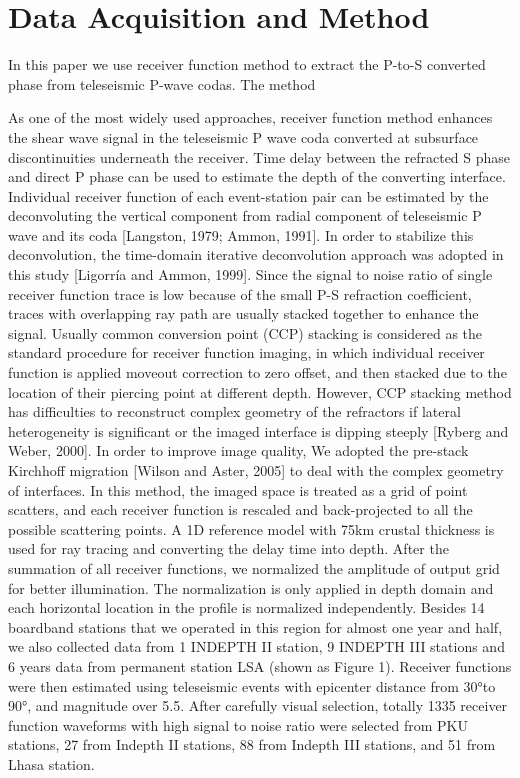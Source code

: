 \section{Data Acquisition and Method}

In this paper we use receiver function method \cite{Langston_1979,ammon1991isolation} to extract the P-to-S converted phase from teleseismic P-wave codas. The method 



As one of the most widely used approaches, receiver function method enhances the shear wave signal in the teleseismic P wave coda converted at subsurface discontinuities underneath the receiver. Time delay between the refracted S phase and direct P phase can be used to estimate the depth of the converting interface. 
Individual receiver function of each event-station pair can be estimated by the deconvoluting the vertical component from radial component of teleseismic P wave and its coda [Langston, 1979; Ammon, 1991]. In order to stabilize this deconvolution, the time-domain iterative deconvolution approach was adopted in this study [Ligorría and Ammon, 1999].
Since the signal to noise ratio of single receiver function trace is low because of the small P-S refraction coefficient, traces with overlapping ray path are usually stacked together to enhance the signal. Usually common conversion point (CCP) stacking is considered as the standard procedure for receiver function imaging, in which individual receiver function is applied moveout correction to zero offset, and then stacked due to the location of their piercing point at different depth. However, CCP stacking method has difficulties to reconstruct complex geometry of the refractors if lateral heterogeneity is significant or the imaged interface is dipping steeply [Ryberg and Weber, 2000]. In order to improve image quality, We adopted the pre-stack Kirchhoff migration [Wilson and Aster, 2005] to deal with the complex geometry of interfaces. In this method, the imaged space is treated as a grid of point scatters, and each receiver function is rescaled and back-projected to all the possible scattering points. A 1D reference model with 75km crustal thickness is used for ray tracing and converting the delay time into depth. After the summation of all receiver functions, we normalized the amplitude of output grid for better illumination. The normalization is only applied in depth domain and each horizontal location in the profile is normalized independently. 
Besides 14 boardband stations that we operated in this region for almost one year and half, we also collected data from 1 INDEPTH II station, 9 INDEPTH III stations and 6 years data from permanent station LSA (shown as Figure 1). Receiver functions were then estimated using teleseismic events with epicenter distance from 30°to 90°, and magnitude over 5.5. After carefully visual selection, totally 1335 receiver function waveforms with high signal to noise ratio were selected from PKU stations, 27 from Indepth II stations, 88 from Indepth III stations, and 51 from Lhasa station.
